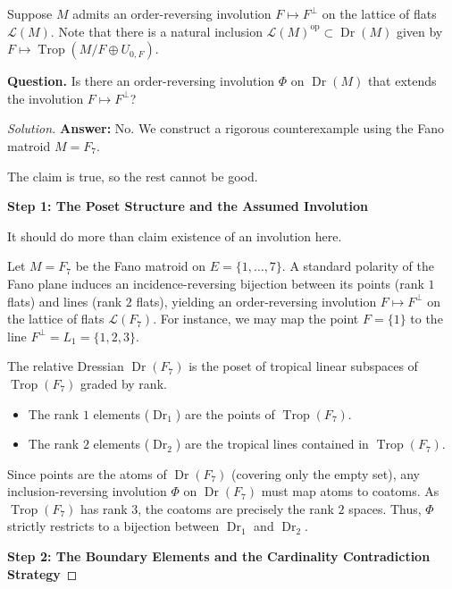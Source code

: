 \documentclass[12pt]{article}
\DeclareMathOperator{\Trop}{Trop}
\DeclareMathOperator{\Dr}{Dr}
\newcommand{\cLL}{\mathcal{L}}
\newcommand{\op}{\mathrm{op}}
\newcommand{\review}[1]{\begin{reviewbox}#1\end{reviewbox}}
\begin{document}
Suppose $M$ admits an order-reversing involution $F\mapsto F^\perp$ on the lattice of flats $\cLL(M)$. Note that there is a natural inclusion $\cLL(M)^{\op} \subset \Dr(M)$ given by $F\mapsto \Trop(M/F\oplus U_{0,F})$.

\medskip
\noindent \textbf{Question.} Is there an order-reversing involution $\Phi$ on $\Dr(M)$ that extends the involution $F\mapsto F^\perp$?

\bigskip

\begin{proof}[Solution]
\textbf{Answer:} No. We construct a rigorous counterexample using the Fano matroid $M = F_7$.

\review{The claim is true, so the rest cannot be good.}
\medskip
\noindent \textbf{Step 1: The Poset Structure and the Assumed Involution}

\review{It should do more than claim existence of an involution here. }
Let $M = F_7$ be the Fano matroid on $E = \{1, \dots, 7\}$. A standard polarity of the Fano plane induces an incidence-reversing bijection between its points (rank $1$ flats) and lines (rank $2$ flats), yielding an order-reversing involution $F \mapsto F^\perp$ on the lattice of flats $\cLL(F_7)$. For instance, we may map the point $F = \{1\}$ to the line $F^\perp = L_1 = \{1,2,3\}$.

The relative Dressian $\Dr(F_7)$ is the poset of tropical linear subspaces of $\Trop(F_7)$ graded by rank. 
\begin{itemize}
    \item The rank $1$ elements ($\Dr_1$) are the points of $\Trop(F_7)$.
    \item The rank $2$ elements ($\Dr_2$) are the tropical lines contained in $\Trop(F_7)$.
\end{itemize}
Since points are the atoms of $\Dr(F_7)$ (covering only the empty set), any inclusion-reversing involution $\Phi$ on $\Dr(F_7)$ must map atoms to coatoms. As $\Trop(F_7)$ has rank $3$, the coatoms are precisely the rank $2$ spaces. Thus, $\Phi$ strictly restricts to a bijection between $\Dr_1$ and $\Dr_2$.

\medskip
\noindent \textbf{Step 2: The Boundary Elements and the Cardinality Contradiction Strategy}


\end{proof}
\end{document}
